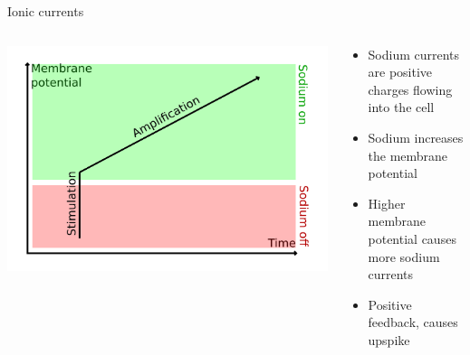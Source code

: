 \documentclass[presentation]{beamer}
\begin{document}
\begin{frame}[label={sec:org4b602f2}]{Ionic currents}
\begin{columns}
\begin{column}{0.5\columnwidth}
\begin{center}
\includegraphics[width=.9\linewidth]{./fastsodium.png}
\end{center}
\end{column}

\begin{column}{0.5\columnwidth}
\begin{itemize}
\item Sodium currents are positive charges flowing into the cell
\item Sodium increases the membrane potential
\item Higher membrane potential causes more sodium currents
\item Positive feedback, causes upspike
\end{itemize}
\end{column}
\end{columns}
\end{frame}
\end{document}
